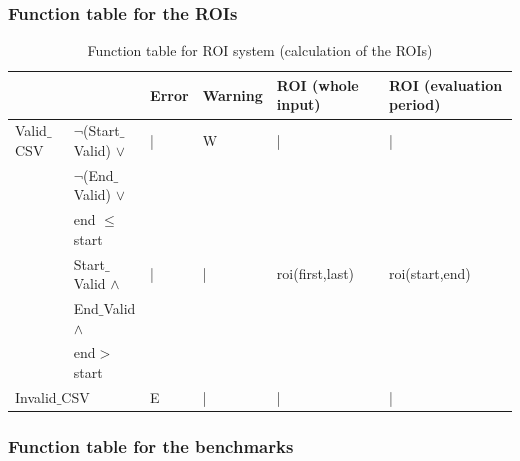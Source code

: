\documentclass[runningheads,12pt]{article}
\begin{document}


\subsubsection{Function table for the ROIs}

\begin{landscape}

\begin{table}[H]
{
\centering

\begin{tabular}{|l|l||l|l|l|l|}
\hline
\multicolumn{2}{|c||}{} & Error & Warning & ROI (whole input) & ROI (evaluation period)\\ 

\hline
Valid$\_$CSV & $\lnot$(Start$\_$Valid) $\vee$ & |& W & | & |\\ 
& $\lnot$(End$\_$Valid) $\vee$ &&&&\\
& end $\le$ start &&& &\\

\cline{2-6}
& Start$\_$Valid  $\wedge$ & |& | & roi(first,last) & roi(start,end)\\
& End$\_$Valid $\wedge$ &&&&\\
& end$>$start &&&&\\

\hline
\multicolumn{2}{|l||}{Invalid$\_$CSV} & E & |& | & |\\ 

\hline
\end{tabular}

\caption{Function table for ROI system (calculation of the ROIs)}
\label{table:ftable_ROI}
}
\end{table}
\end{landscape}


\subsubsection{Function table for the benchmarks}
\end{document}
